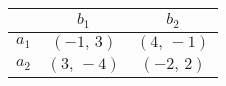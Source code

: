 \begin{tabular}{|c|c|c|}
\hline
 & $b_{1}$ & $b_{2}$ \\
\hline
$a_{1}$ & $(-1,\,3)$ & $(4,\,-1)$ \\
\hline
$a_{2}$ & $(3,\,-4)$ & $(-2,\,2)$ \\
\hline
\end{tabular}
